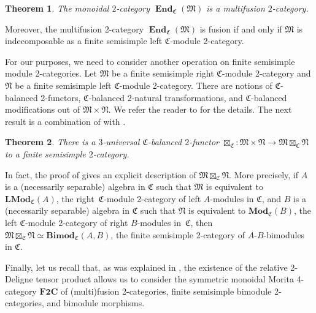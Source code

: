 \documentclass[pdftex]{sigma}
\newtheorem{Theorem}{Theorem}[section]
\numberwithin{equation}{section}
\begin{document}
\begin{Theorem}\label{thm:Moritadual}
The monoidal $2$-category $\mathbf{\operatorname{End}}_{\mathfrak{C}}(\mathfrak{M})$ is a multifusion $2$-category.
\end{Theorem}

Moreover, the multifusion 2-category $\mathbf{\operatorname{End}}_{\mathfrak{C}}(\mathfrak{M})$ is fusion if and only if $\mathfrak{M}$ is indecomposable as a finite semisimple left $\mathfrak{C}$-module 2-category.

For our purposes, we need to consider another operation on finite semisimple module 2-categories. Let $\mathfrak{M}$ be a finite semisimple right $\mathfrak{C}$-module 2-category and $\mathfrak{N}$ be a finite semisimple left $\mathfrak{C}$-module 2-category. There are notions of $\mathfrak{C}$-balanced 2-functors, $\mathfrak{C}$-balanced 2-natural transformations, and $\mathfrak{C}$-balanced modifications out of $\mathfrak{M}\times\mathfrak{N}$. We refer the reader to \cite[Section~2.2]{D10} for the details. The next result is a combination of \cite[Theorem~2.2.4]{D10} with \cite[Corollary~5.1.3]{D9}.

\begin{Theorem}
There is a $3$-universal $\mathfrak{C}$-balanced $2$-functor $\boxtimes_{\mathfrak{C}}\colon \mathfrak{M}\times\mathfrak{N}\rightarrow \mathfrak{M}\boxtimes_{\mathfrak{C}}\mathfrak{N}$ to a finite semisimple $2$-category.
\end{Theorem}

In fact, the proof of \cite[Theorem~2.2.4]{D10} gives an explicit description of $\mathfrak{M}\boxtimes_{\mathfrak{C}}\mathfrak{N}$. More precisely, if $A$ is a (necessarily separable) algebra in $\mathfrak{C}$ such that $\mathfrak{M}$ is equivalent to $\mathbf{LMod}_{\mathfrak{C}}(A)$, the right~$\mathfrak{C}$-module 2-category of left $A$-modules in $\mathfrak{C}$, and $B$ is a (necessarily separable) algebra in $\mathfrak{C}$ such that $\mathfrak{N}$ is equivalent to $\mathbf{Mod}_{\mathfrak{C}}(B)$, the left $\mathfrak{C}$-module 2-category of right $B$-modules in~$\mathfrak{C}$, then~$\mathfrak{M}\boxtimes_{\mathfrak{C}}\mathfrak{N}\simeq \mathbf{Bimod}_{\mathfrak{C}}(A,B)$, the finite semisimple 2-category of $A$-$B$-bimodules in $\mathfrak{C}$.

Finally, let us recall that, as was explained in \cite[Section~3.2]{D10}, the existence of the relative 2-Deligne tensor product allows us to consider the symmetric monoidal Morita 4-category $\mathbf{F2C}$ of (multi)fusion 2-categories, finite semisimple bimodule 2-categories, and bimodule morphisms.
\end{document}
